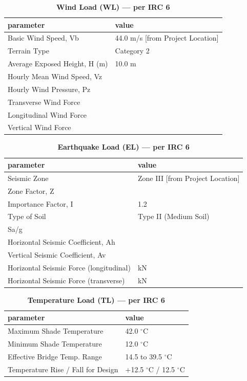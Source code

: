 \documentclass[12pt,a4paper]{report}
\numberwithin{table}{chapter}
\numberwithin{figure}{chapter}
\begin{document}
\vspace{1em}
\begin{longtable}{|L{5.5cm}|p{10.0cm}|}
\caption{\textbf{Wind Load (WL) --- per IRC 6}}
\hline
\textbf{parameter} & \textbf{value} \\
\hline
\textnormal{Basic Wind Speed, Vb} & 44.0 m/s [from Project Location] \\[6pt]
\hline
\textnormal{Terrain Type} & Category 2 \\[6pt]
\hline
\textnormal{Average Exposed Height, H (m)} & 10.0 m \\[6pt]
\hline
\textnormal{Hourly Mean Wind Speed, Vz} &  \\[6pt]
\hline
\textnormal{Hourly Wind Pressure, Pz} &  \\[6pt]
\hline
\textnormal{Transverse Wind Force} &  \\[6pt]
\hline
\textnormal{Longitudinal Wind Force} &  \\[6pt]
\hline
\textnormal{Vertical Wind Force} &  \\[6pt]
\hline
\end{longtable}

\vspace{1em}
\begin{longtable}{|L{5.5cm}|p{10.0cm}|}
\caption{\textbf{Earthquake Load (EL) --- per IRC 6}}
\hline
\textbf{parameter} & \textbf{value} \\
\hline
\textnormal{Seismic Zone} & Zone III [from Project Location] \\[6pt]
\hline
\textnormal{Zone Factor, Z} &  \\[6pt]
\hline
\textnormal{Importance Factor, I} & 1.2 \\[6pt]
\hline
\textnormal{Type of Soil} & Type II (Medium Soil) \\[6pt]
\hline
\textnormal{Sa/g} &  \\[6pt]
\hline
\textnormal{Horizontal Seismic Coefficient, Ah} &  \\[6pt]
\hline
\textnormal{Vertical Seismic Coefficient, Av} &  \\[6pt]
\hline
\textnormal{Horizontal Seismic Force (longitudinal)} &  kN \\[6pt]
\hline
\textnormal{Horizontal Seismic Force (transverse)} &  kN \\[6pt]
\hline
\end{longtable}

\vspace{1em}
\begin{longtable}{|L{5.5cm}|p{10.0cm}|}
\caption{\textbf{Temperature Load (TL) --- per IRC 6}}
\hline
\textbf{parameter} & \textbf{value} \\
\hline
\textnormal{Maximum Shade Temperature} & 42.0 $^\circ$C \\[6pt]
\hline
\textnormal{Minimum Shade Temperature} & 12.0 $^\circ$C \\[6pt]
\hline
\textnormal{Effective Bridge Temp. Range} & 14.5 to 39.5 $^\circ$C \\[6pt]
\hline
\textnormal{Temperature Rise / Fall for Design} & +12.5 $^\circ$C / \textminus{}12.5 $^\circ$C \\[6pt]
\hline
\end{longtable}
\end{document}
